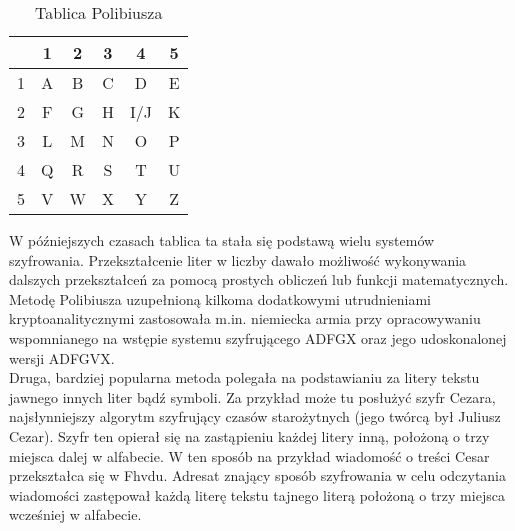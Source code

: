 \documentclass[a4paper]{article}
\begin{document}
\begin{table}[h]
\centering\caption{Tablica Polibiusza}\label{tabela 1}
\begin{tabular}{|c|c|c|c|c|c|}
\hline
& 1 & 2 & 3 & 4 & 5\\
\hline
1 & A & B & C & D & E\\
\hline
2 & F & G & H &I/J &K\\
\hline
3 & L & M & N & O &P \\
\hline
4 & Q & R & S & T & U\\
\hline
5 & V & W &X & Y & Z \\
\hline

\end{tabular}
\end{table}
W późniejszych czasach tablica ta stała się podstawą wielu systemów szyfrowania. Przekształcenie
liter w liczby dawało możliwość wykonywania dalszych przekształceń za pomocą prostych obliczeń
lub funkcji matematycznych. Metodę Polibiusza uzupełnioną kilkoma dodatkowymi utrudnieniami
kryptoanalitycznymi zastosowała m.in. niemiecka armia przy opracowywaniu wspomnianego na
wstępie systemu szyfrującego ADFGX oraz jego udoskonalonej wersji ADFGVX.\\
Druga, bardziej popularna metoda polegała na podstawianiu za litery tekstu jawnego innych liter
bądź symboli. Za przykład może tu posłużyć szyfr Cezara, najsłynniejszy algorytm szyfrujący czasów starożytnych (jego twórcą był Juliusz Cezar). Szyfr ten opierał się na zastąpieniu każdej
litery inną, położoną o trzy miejsca dalej w alfabecie. W ten sposób na przykład wiadomość o treści
Cesar przekształca się w Fhvdu. Adresat znający sposób szyfrowania w celu odczytania wiadomości
zastępował każdą literę tekstu tajnego literą położoną o trzy miejsca wcześniej w alfabecie.
\end{document}
